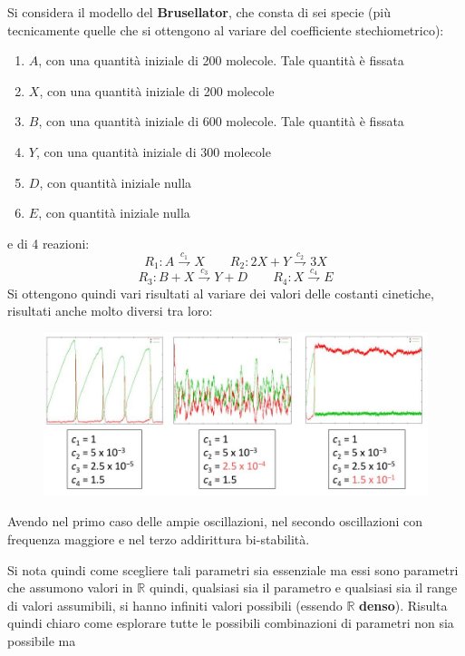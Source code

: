 \documentclass[a4paper,12pt, oneside]{book}
\begin{document}
\begin{esempio}
  Si considera il modello del \textbf{Brusellator}, che consta di sei specie
  (più tecnicamente quelle che si ottengono al variare del coefficiente
  stechiometrico):
  \begin{enumerate}
    \item $A$, con una quantità iniziale di 200 molecole. Tale quantità è
    fissata
    \item $X$, con una quantità iniziale di 200 molecole
    \item $B$, con una quantità iniziale di 600 molecole. Tale quantità è
    fissata
    \item $Y$, con una quantità iniziale di 300 molecole
    \item $D$, con quantità iniziale nulla
    \item $E$, con quantità iniziale nulla
  \end{enumerate}
  e di 4 reazioni:
  \[R_1:A\stackrel{c_1}{\rightharpoondown}X\qquad
    R_2:2X + Y\stackrel{c_2}{\rightharpoondown}3X\] 
  \[R_3:B+X\stackrel{c_3}{\rightharpoondown}Y + D\qquad
    R_4:X\stackrel{c_4}{\rightharpoondown}E\] 
  Si ottengono quindi vari risultati al variare dei valori delle costanti
  cinetiche, risultati anche molto diversi tra loro:
  \begin{figure}[H]
    \centering
    \includegraphics[scale = 0.35]{img/bru.jpg}
  \end{figure}
  Avendo nel primo caso delle ampie oscillazioni, nel secondo oscillazioni con
  frequenza maggiore e nel terzo addirittura bi-stabilità.
\end{esempio}
Si nota quindi come scegliere tali parametri sia essenziale ma essi sono
parametri che assumono valori in $\mathbb{R}$ quindi, qualsiasi sia il parametro
e qualsiasi sia il range di valori assumibili, si hanno infiniti valori
possibili (essendo $\mathbb{R}$ \textbf{denso}). Risulta quindi chiaro come
esplorare tutte le possibili combinazioni di parametri non sia possibile ma
\end{document}
